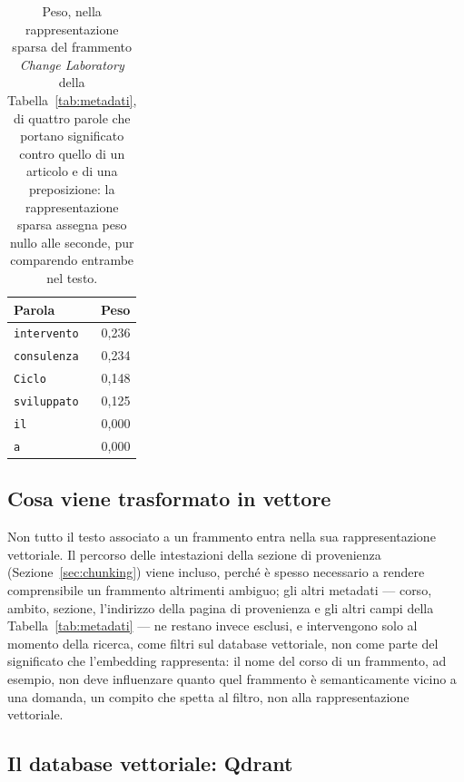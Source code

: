 \begin{table}[H]
  \centering
  \small
  \begin{tabular}{@{} l r @{}}
    \toprule
    \textbf{Parola} & \textbf{Peso} \\
    \midrule
    \texttt{intervento} & 0,236 \\
    \texttt{consulenza} & 0,234 \\
    \texttt{Ciclo} & 0,148 \\
    \texttt{sviluppato} & 0,125 \\
    \midrule
    \texttt{il} & 0,000 \\
    \texttt{a} & 0,000 \\
    \bottomrule
  \end{tabular}
  \caption{Peso, nella rappresentazione sparsa del frammento \emph{Change Laboratory} della Tabella~\ref{tab:metadati},
  di quattro parole che portano significato contro quello di un articolo e di una preposizione: la rappresentazione
  sparsa assegna peso nullo alle seconde, pur comparendo entrambe nel testo.}
  \label{tab:sparse-esempio}
\end{table}

\subsection{Cosa viene trasformato in vettore}

Non tutto il testo associato a un frammento entra nella sua rappresentazione vettoriale. Il percorso delle
intestazioni della sezione di provenienza (Sezione~\ref{sec:chunking}) viene incluso, perché è spesso necessario a
rendere comprensibile un frammento altrimenti ambiguo; gli altri metadati --- corso, ambito, sezione,
l'indirizzo della pagina di provenienza e gli altri campi della Tabella~\ref{tab:metadati} --- ne restano invece
esclusi, e intervengono solo al momento della ricerca, come filtri sul database vettoriale, non
come parte del significato che l'embedding rappresenta: il nome del corso di un frammento, ad esempio, non deve
influenzare quanto quel frammento è semanticamente vicino a una domanda, un compito che spetta al filtro, non alla
rappresentazione vettoriale.

\subsection{Il database vettoriale: Qdrant}

